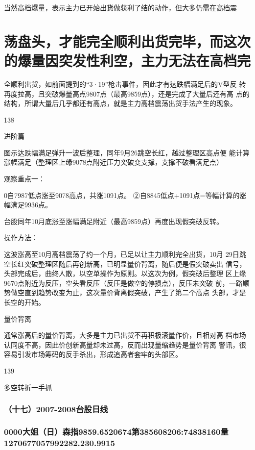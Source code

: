 \documentclass{article}
\begin{document}
当然高档爆量，表示主力已开始出货做获利了结的动作，但大多仍需在高档震

\section{荡盘头，才能完全顺利出货完毕，而这次的爆量因突发性利空，主力无法在高档完}

全顺利出货，如前面提到的“3·19”枪击事件，因此才有达跌幅满足后的V型反 转再度拉高，且突破爆量高点9807点（最高9859点），还是完成了大量后还有高 点的结构，所谓大量后几乎都还有高点，就是主力高档震荡出货手法产生的现象。

138

\clearpage

进阶篇

图示达跌幅满足弹升一波后整理，同年9月26跳空长红，越过整理区高点便 能计算涨幅满足（整理区上缘9078点附近压力突破变支撑，支撑不破看满足点）

观察重点一：

0自7987低点涨至9078高点，共涨1091点。 ②自8845低点+1091点=等幅计算的涨幅满足9936点。

台股同年10月底涨至涨幅满足附近（最高9859点）再度出现假突破反转。

操作方法：

这波涨高至10月高档震荡了约一个月，已足以让主力顺利完全出货，10月 29日跳空长红突破整理区随后再创新高，已明显量价背离，随后便是假突破卖出 信号，头部完成后，曲终人散，以空单操作为原则。以这次为例，假突破后整理 区上缘9670点附近为反压，空头看反压（反压是做空的停损点），反压未突破 前，一路顺势做空直到趋势改变为止，这次量价背离假突破，产生了第二个高点 头部，才是长空的开始。

量价背离

通常涨高后的量价背离，大多是主力已出货不再积极滚量作价，且相对高 档市场认同度不高，因此价创新高量却未过高，反而出现量缩趋势是量价背离 警讯，很容易引发市场筹码的反手杀出，形成追高者套牢的头部区。

139

\clearpage

多空转折一手抓

\subsubsection{（十七）2007-2008台股日线}

\subsubsection{0000大姐（日）森指9859.6520674第385608206:74838160量1270677057992282.230.9915}
\end{document}
